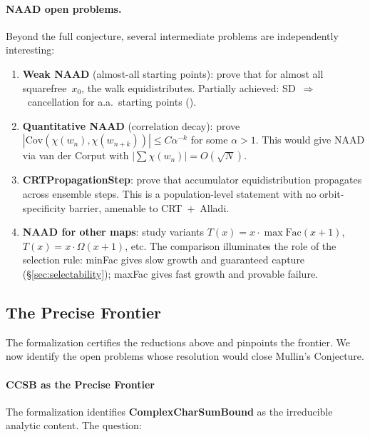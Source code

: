 \paragraph{NAAD open problems.}
Beyond the full conjecture, several intermediate problems are
independently interesting:

\begin{enumerate}[nosep]
\item \textbf{Weak NAAD} (almost-all starting points): prove that for
  almost all squarefree~$x_0$, the walk equidistributes.  Partially
  achieved: SD~$\Rightarrow$~cancellation for a.a.\ starting points
  ().

\item \textbf{Quantitative NAAD} (correlation decay): prove
  $|\mathrm{Cov}(\chi(w_n), \chi(w_{n+k}))| \leq C \alpha^{-k}$
  for some $\alpha > 1$.  This would give NAAD via van der Corput
  with $|\sum \chi(w_n)| = O(\sqrt{N})$.

\item \textbf{CRTPropagationStep}: prove that accumulator
  equidistribution propagates across ensemble steps.  This is a
  population-level statement with no orbit-specificity barrier,
  amenable to CRT~$+$~Alladi.

\item \textbf{NAAD for other maps}: study variants
  $T(x) = x \cdot \max\mathrm{Fac}(x{+}1)$,
  $T(x) = x \cdot \Omega(x{+}1)$, etc.  The comparison illuminates the
  role of the selection rule: minFac gives slow growth and guaranteed
  capture (\S\ref{sec:selectability}); maxFac gives fast growth and
  provable failure.
\end{enumerate}


\subsection{The Precise Frontier}
\label{sec:precise-frontier}

The formalization certifies the reductions above and pinpoints the
frontier.  We now identify the open problems whose resolution
would close Mullin's Conjecture.

\paragraph{CCSB as the Precise Frontier}

The formalization identifies \textbf{ComplexCharSumBound} as the
irreducible analytic content.  The question:

